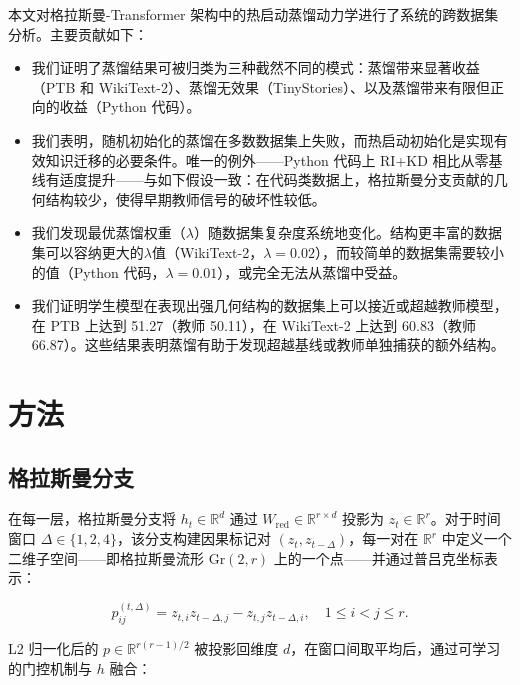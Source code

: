\documentclass[conference]{IEEEtran}
\begin{document}
本文对格拉斯曼-Transformer 架构中的热启动蒸馏动力学进行了系统的跨数据集分析。主要贡献如下：
\begin{itemize}
\item 我们证明了蒸馏结果可被归类为三种截然不同的模式：蒸馏带来显著收益（PTB 和 WikiText-2）、蒸馏无效果（TinyStories）、以及蒸馏带来有限但正向的收益（Python 代码）。

\item 我们表明，随机初始化的蒸馏在多数数据集上失败，而热启动初始化是实现有效知识迁移的必要条件。唯一的例外——Python 代码上 RI+KD 相比从零基线有适度提升——与如下假设一致：在代码类数据上，格拉斯曼分支贡献的几何结构较少，使得早期教师信号的破坏性较低。

\item 我们发现最优蒸馏权重（$\lambda$）随数据集复杂度系统地变化。结构更丰富的数据集可以容纳更大的$\lambda$值（WikiText-2，$\lambda=0.02$），而较简单的数据集需要较小的值（Python 代码，$\lambda=0.01$），或完全无法从蒸馏中受益。

\item 我们证明学生模型在表现出强几何结构的数据集上可以接近或超越教师模型，在 PTB 上达到 51.27（教师 50.11），在 WikiText-2 上达到 60.83（教师 66.87）。这些结果表明蒸馏有助于发现超越基线或教师单独捕获的额外结构。

\end{itemize}

\section{方法}

\subsection{格拉斯曼分支}
在每一层，格拉斯曼分支将 $h_t \in \mathbb{R}^d$ 通过
$W_{\mathrm{red}} \in \mathbb{R}^{r \times d}$ 投影为
$z_t \in \mathbb{R}^r$。对于时间窗口
$\Delta \in \{1, 2, 4\}$，该分支构建因果标记对
$(z_t, z_{t-\Delta})$，每一对在 $\mathbb{R}^r$ 中定义一个二维子空间——即格拉斯曼流形
$\mathrm{Gr}(2,r)$ 上的一个点\cite{edelman1998grassmann,absil2008opt,jiang2025grassmann,valperga2023riemannian}——并通过普吕克坐标表示：

\begin{equation}
p_{ij}^{(t,\Delta)} = z_{t,i} z_{t-\Delta,j} - z_{t,j} z_{t-\Delta,i},
\quad 1 \le i < j \le r.
\label{eq:plucker}
\end{equation}

L2 归一化后的 $p \in \mathbb{R}^{r(r-1)/2}$ 被投影回维度 $d$，在窗口间取平均后，通过可学习的门控机制与 $h$ 融合：
\end{document}
